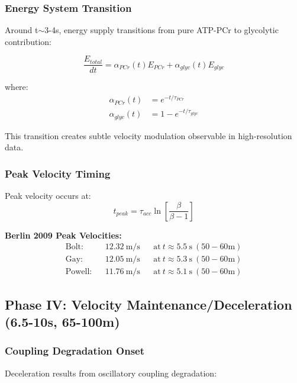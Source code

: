\subsubsection{Energy System Transition}

Around t$\sim$3-4s, energy supply transitions from pure ATP-PCr to glycolytic contribution:

\begin{equation}
\frac{E_{total}}{dt} = \alpha_{PCr}(t) E_{PCr} + \alpha_{glyc}(t) E_{glyc}
\label{eq:energy_transition}
\end{equation}

where:
\begin{align}
\alpha_{PCr}(t) &= e^{-t/\tau_{PCr}} \\
\alpha_{glyc}(t) &= 1 - e^{-t/\tau_{glyc}}
\end{align}

This transition creates subtle velocity modulation observable in high-resolution data.

\subsubsection{Peak Velocity Timing}

Peak velocity occurs at:
\begin{equation}
t_{peak} = \tau_{acc} \ln\left[\frac{\beta}{\beta - 1}\right]
\label{eq:peak_velocity_time}
\end{equation}

\textbf{Berlin 2009 Peak Velocities:}
\begin{align}
\text{Bolt:} && 12.32~\text{m/s} && \text{at}~t \approx 5.5~\text{s}~(50-60\text{m}) \\
\text{Gay:} && 12.05~\text{m/s} && \text{at}~t \approx 5.3~\text{s}~(50-60\text{m}) \\
\text{Powell:} && 11.76~\text{m/s} && \text{at}~t \approx 5.1~\text{s}~(50-60\text{m})
\end{align}

\subsection{Phase IV: Velocity Maintenance/Deceleration (6.5-10s, 65-100m)}

\subsubsection{Coupling Degradation Onset}

Deceleration results from oscillatory coupling degradation:

